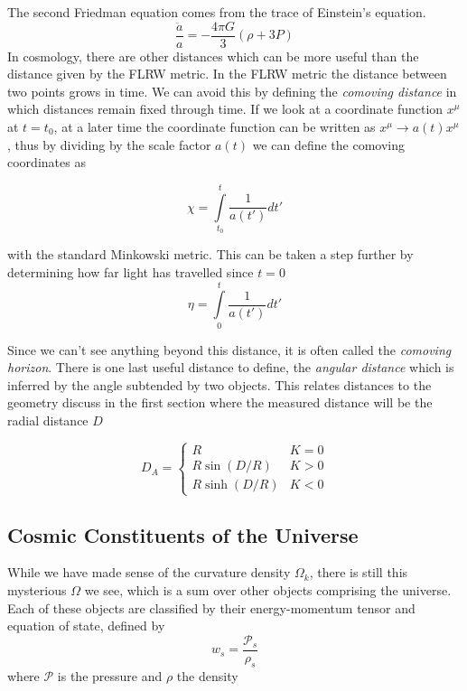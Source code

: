 The second Friedman equation comes from the trace of Einstein's equation.
\begin{equation}
    \frac{\ddot a}{a} = -\frac{4\pi G}{3}(\rho + 3P)
\end{equation}
In cosmology, there are other distances which can be more useful than the distance given by the FLRW metric. 
In the FLRW metric the distance between two points grows in time. 
We can avoid this by defining the \textit{comoving distance} in which distances remain fixed through time. 
If we look at a coordinate function $x^\mu$ at $t=t_0$, at a later time the coordinate function can be written as $x^\mu \rightarrow a(t) x^\mu$, thus by dividing by the scale factor $a(t)$ we can define the comoving coordinates as

\begin{equation}
    \chi = \int\limits^{t}_{t_0} \frac{1}{a(t')} dt'
\end{equation}

with the standard Minkowski metric. This can be taken a step further by determining how far light has travelled since $t=0$
\begin{equation}
    \eta = \int\limits^t_0 \frac{1}{a(t')}dt'
\end{equation}

Since we can't see anything beyond this distance, it is often called the \textit{comoving horizon}. 
There is one last useful distance to define, the \textit{angular distance} which is inferred by the angle subtended by two objects. 
This relates distances to the geometry discuss in the first section where the measured distance will be the radial distance $D$

\begin{equation}
    D_A = \left\{ \begin{array}{cc}
        R & K=0 \\
        R\sin(D/R) & K>0 \\
        R\sinh(D/R) & K<0
    \end{array}
    \right.
\end{equation}
\subsection{Cosmic Constituents of the Universe}
While we have made sense of the curvature density $\Omega_k$, there is still this mysterious $\Omega$ we see, which is a sum over other objects comprising the universe. Each of these objects are classified by their energy-momentum tensor and equation of state, defined by
\begin{equation}
    w_s = \frac{\mathcal{P}_s}{\rho_s}
\end{equation}
where $\mathcal{P}$ is the pressure and $\rho$ the density
